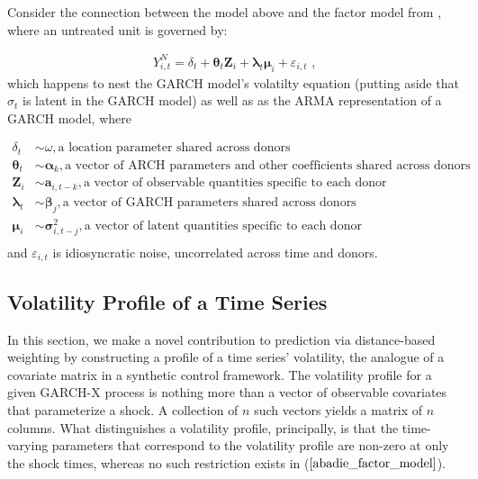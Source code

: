 \documentclass[11pt]{article}
\theoremstyle{definition}
\begin{document}
Consider the connection between the model above and the factor model from \citet{abadie2010synthetic}, where an untreated unit is governed by:

\begin{align}
Y^{N}_{i,t} = \delta_{t} + \boldsymbol\theta_{t}\textbf{Z}_{i}+\boldsymbol\lambda_{t}\boldsymbol\mu_{i}+\varepsilon_{i,t} \text{ ,} \label{abadie_factor_model}
\end{align}
which happens to nest the GARCH model's volatilty equation (putting aside that $\sigma_{t}$ is latent in the GARCH model) as well as as the ARMA representation of a GARCH model, where

\begin{align*}
\delta_{t} & \sim \omega,  \text{a location parameter shared across donors}\\
\boldsymbol\theta_{t} & \sim \boldsymbol\alpha_{k},  \text{a vector of ARCH parameters and other coefficients shared across donors} \\
\textbf{Z}_{i} & \sim \boldsymbol a_{i,t-k}, \text{a vector of observable quantities specific to each donor} \\
\boldsymbol \lambda_{t} & \sim \boldsymbol\beta_{j}, \text{a vector of GARCH parameters shared across donors} \\
\boldsymbol \mu_{i} & \sim \boldsymbol \sigma_{i,t-j}^{2}, \text{a vector of latent quantities specific to each donor}   \\
\end{align*}
and $\varepsilon_{i,t}$ is idiosyncratic noise, uncorrelated across time and donors.

    \subsection{Volatility Profile of a Time Series}
    \label{Volatility Shock Profile of a Time Series}
    
    In this section, we make a novel contribution to prediction via distance-based weighting by constructing a profile of a time series' volatility, the analogue of a covariate matrix in a synthetic control framework.  The volatility profile for a given GARCH-X process is nothing more than a vector of observable covariates that parameterize a shock.  A collection of $n$ such vectors yields a matrix of $n$ columns.  What distinguishes a volatility profile, principally, is that the time-varying parameters that correspond to the volatility profile are non-zero at only the shock times, whereas no such restriction exists in ($\ref{abadie_factor_model}$).  
    
\end{document}
